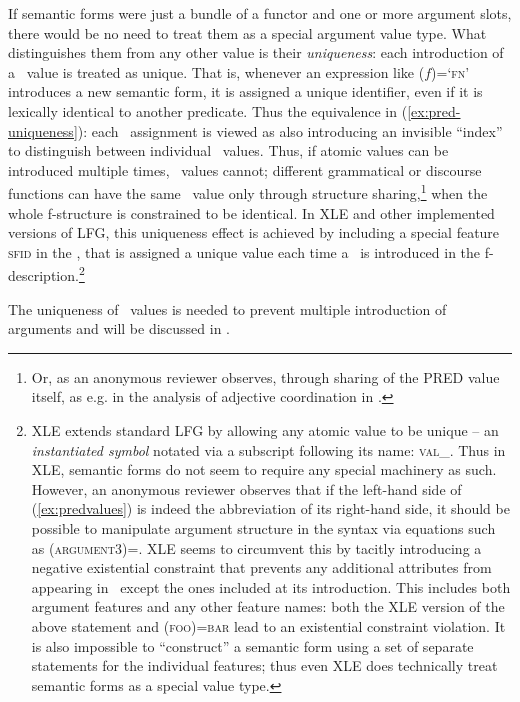 \documentclass[output=paper,hidelinks]{langscibook}
\begin{document}
 \largerpage
 If semantic forms were just a bundle of a functor and one or more argument slots, there would be no need to treat them as a special argument value type. What distinguishes them from any other value is their \textit{uniqueness}: each introduction of a \PRED\ value is treated as unique. That is, whenever an expression like ($f$\;\PRED)=\textsc{`fn'} introduces a new semantic form, it is assigned a unique identifier, even if it is lexically identical to another predicate. Thus the equivalence in (\ref{ex:pred-uniqueness}): each \PRED\ assignment is viewed as also introducing an invisible ``index'' to distinguish between individual \PRED\ values. Thus, if atomic values can be introduced multiple times, \PRED\ values cannot; different grammatical or discourse functions can have the same \PRED\ value only through structure sharing,\footnote{Or, as an anonymous reviewer observes, through sharing of the PRED value itself, as e.g. in the analysis of
adjective coordination in \citet{belyaev-etal2015}.} when the whole f-structure is constrained to be identical. In XLE and other implemented versions of LFG, this uniqueness effect is achieved by including a special feature \textsc{sfid} in the \PRED, that is assigned a unique value each time a \PRED\ is introduced in the f-description.\footnote{XLE extends standard LFG by allowing any atomic value to be unique -- an \textit{instantiated symbol} notated via a subscript following its name: \textsc{val\_}. Thus in XLE, semantic forms do not seem to require any special machinery as such. However, an anonymous reviewer observes that if the left-hand side of (\ref{ex:predvalues}) is indeed the abbreviation of its right-hand side, it should be possible to manipulate argument structure in the syntax via equations such as (\UP\PRED\textsc{argument3})=\DOWN. XLE seems to circumvent this by tacitly introducing a negative existential constraint that prevents any additional attributes from appearing in \PRED\ except the ones included at its introduction. This includes both argument features and any other feature names: both the XLE version of the above statement and (\UP\PRED\textsc{foo})=\textsc{bar} lead to an existential constraint violation. It is also impossible to ``construct'' a semantic form using a set of separate statements for the individual features; thus even XLE does technically treat semantic forms as a special value type.}

 The uniqueness of \PRED\ values is needed to prevent multiple introduction of arguments and will be discussed in .
 
\end{document}
